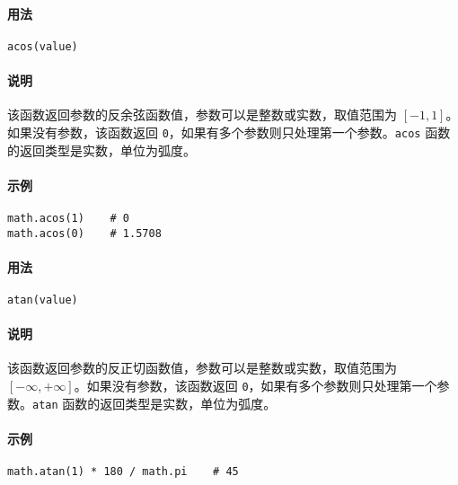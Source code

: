 
\paragraph{用法}
\begin{lstlisting}[language=berry, numbers=none]
acos(value)
\end{lstlisting}

\paragraph{说明}
该函数返回参数的反余弦函数值，参数可以是整数或实数，取值范围为 $[-1,1]$。如果没有参数，该函数返回 \texttt{0}，如果有多个参数则只处理第一个参数。\texttt{acos} 函数的返回类型是实数，单位为弧度。

\paragraph{示例}
\begin{lstlisting}[language=berry, numbers=none]
math.acos(1)    # 0
math.acos(0)    # 1.5708
\end{lstlisting}


\paragraph{用法}
\begin{lstlisting}[language=berry, numbers=none]
atan(value)
\end{lstlisting}

\paragraph{说明}
该函数返回参数的反正切函数值，参数可以是整数或实数，取值范围为 $[-\infty,+\infty]$。如果没有参数，该函数返回 \texttt{0}，如果有多个参数则只处理第一个参数。\texttt{atan} 函数的返回类型是实数，单位为弧度。

\paragraph{示例}
\begin{lstlisting}[language=berry, numbers=none]
math.atan(1) * 180 / math.pi    # 45
\end{lstlisting}

